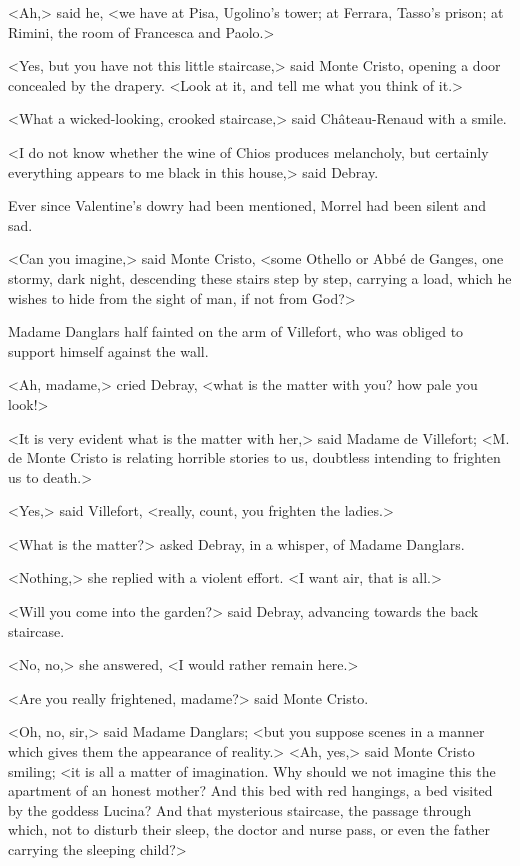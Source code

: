  <Ah,> said he, <we have at Pisa, Ugolino's tower; at Ferrara, Tasso's prison; at Rimini, the room of Francesca and Paolo.> 

 <Yes, but you have not this little staircase,> said Monte Cristo, opening a door concealed by the drapery. <Look at it, and tell me what you think of it.> 

 <What a wicked-looking, crooked staircase,> said Château-Renaud with a smile. 

 <I do not know whether the wine of Chios produces melancholy, but certainly everything appears to me black in this house,> said Debray. 

 Ever since Valentine's dowry had been mentioned, Morrel had been silent and sad. 

 <Can you imagine,> said Monte Cristo, <some Othello or Abbé de Ganges, one stormy, dark night, descending these stairs step by step, carrying a load, which he wishes to hide from the sight of man, if not from God?> 

 Madame Danglars half fainted on the arm of Villefort, who was obliged to support himself against the wall. 

 <Ah, madame,> cried Debray, <what is the matter with you? how pale you look!> 

 <It is very evident what is the matter with her,> said Madame de Villefort; <M. de Monte Cristo is relating horrible stories to us, doubtless intending to frighten us to death.> 

 <Yes,> said Villefort, <really, count, you frighten the ladies.> 

 <What is the matter?> asked Debray, in a whisper, of Madame Danglars. 

 <Nothing,> she replied with a violent effort. <I want air, that is all.> 

 <Will you come into the garden?> said Debray, advancing towards the back staircase. 

 <No, no,> she answered, <I would rather remain here.> 

 <Are you really frightened, madame?> said Monte Cristo. 

 <Oh, no, sir,> said Madame Danglars; <but you suppose scenes in a manner which gives them the appearance of reality.>  <Ah, yes,> said Monte Cristo smiling; <it is all a matter of imagination. Why should we not imagine this the apartment of an honest mother? And this bed with red hangings, a bed visited by the goddess Lucina? And that mysterious staircase, the passage through which, not to disturb their sleep, the doctor and nurse pass, or even the father carrying the sleeping child?> 

